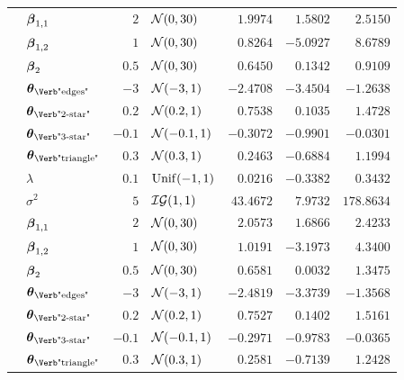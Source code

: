 \begin{table}[t]
\begin{tabular}{cl|rlrrr}
        & $\boldsymbol{\beta}_{1,1}$                     & $2$    & $\mathcal{N}(0,30)$      & $1.9974$  & $1.5802$  & $2.5150$   \\
        & $\boldsymbol{\beta}_{1,2}$                     & $1$    & $\mathcal{N}(0,30)$      & $0.8264$  & $-5.0927$ & $8.6789$   \\
        & $\boldsymbol{\beta}_{2}$                       & $0.5$  & $\mathcal{N}(0,30)$      & $0.6450$  & $0.1342$  & $0.9109$   \\
        & $\ttheta_{\text{\Verb"edges"}}$    & $-3$   & $\mathcal{N}(-3,1)$      & $-2.4708$ & $-3.4504$ & $-1.2638$  \\
        & $\ttheta_{\text{\Verb"2-star"}}$   & $0.2$  & $\mathcal{N}(0.2,1)$     & $0.7538$  & $0.1035$  & $1.4728$   \\
        & $\ttheta_{\text{\Verb"3-star"}}$   & $-0.1$ & $\mathcal{N}(-0.1,1)$    & $-0.3072$ & $-0.9901$ & $-0.0301$  \\
        & $\ttheta_{\text{\Verb"triangle"}}$ & $0.3$  & $\mathcal{N}(0.3,1)$     & $0.2463$  & $-0.6884$ & $1.1994$   \\
		\midrule
        & $\lambda$                          & $0.1$  & $\mathrm{Unif}(-1,1)$     & $0.0216$  & $-0.3382$ & $0.3432$   \\
        & $\sigma^2$                         & $5$    & $\mathcal{IG}(1,1)$ & $43.4672$ & $7.9732$  & $178.8634$ \\
        & $\boldsymbol{\beta}_{1,1}$                     & $2$    & $\mathcal{N}(0,30)$      & $2.0573$  & $1.6866$  & $2.4233$   \\
        & $\boldsymbol{\beta}_{1,2}$                     & $1$    & $\mathcal{N}(0,30)$      & $1.0191$  & $-3.1973$ & $4.3400$   \\
        & $\boldsymbol{\beta}_{2}$                       & $0.5$  & $\mathcal{N}(0,30)$      & $0.6581$  & $0.0032$  & $1.3475$   \\
        & $\ttheta_{\text{\Verb"edges"}}$    & $-3$   & $\mathcal{N}(-3,1)$      & $-2.4819$ & $-3.3739$ & $-1.3568$  \\
        & $\ttheta_{\text{\Verb"2-star"}}$   & $0.2$  & $\mathcal{N}(0.2,1)$     & $0.7527$  & $0.1402$  & $1.5161$   \\
        & $\ttheta_{\text{\Verb"3-star"}}$   & $-0.1$ & $\mathcal{N}(-0.1,1)$    & $-0.2971$ & $-0.9783$ & $-0.0365$  \\
        & $\ttheta_{\text{\Verb"triangle"}}$ & $0.3$  & $\mathcal{N}(0.3,1)$     & $0.2581$  & $-0.7139$ & $1.2428$   \\

\end{tabular}
\end{table}

